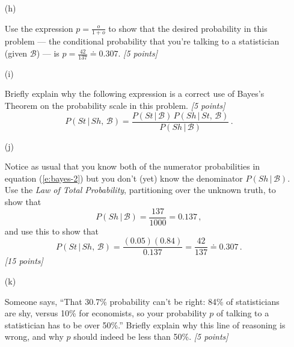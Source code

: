 \documentclass[12pt]{article}
\newcommand{\given}{\, | \,}
\begin{document}
\begin{itemize}
\item[(h)]

Use the expression $p = \frac{ o }{ 1 + o }$ to show that the desired probability in this problem --- the conditional probability that you're talking to a statistician (given $\mathcal{ B }$) --- is $p = \frac{ 42 }{ 137 } \doteq 0.307$. \textit{[5 points]}

\vspace*{0.75in}

\item[(i)]

Briefly explain why the following expression is a correct use of Bayes's Theorem on the probability scale in this problem. \textit{[5 points]}
\begin{equation} \label{e:bayes-1}
P ( St \given Sh, \, \mathcal{ B } ) = \frac{ P ( St \given \mathcal{ B } ) \, P ( Sh \given St, \, \mathcal{ B } ) }{ P ( Sh \given \mathcal{ B } ) } \, .
\end{equation}

\vspace*{0.5in}

\item[(j)]

Notice as usual that you know both of the numerator probabilities in equation (\ref{e:bayes-2}) but you don't (yet) know the denominator $P ( Sh \given \mathcal{ B } )$. Use the \textit{Law of Total Probability}, partitioning over the unknown truth, to show that
\begin{equation} \label{e:bayes-2}
P ( Sh \given \mathcal{ B } ) = \frac{ 137 }{ 1000 } = 0.137 \, ,
\end{equation}
and use this to show that
\begin{equation} \label{e:bayes-3}
P ( St \given Sh, \, \mathcal{ B } ) = \frac{ ( 0.05 ) ( 0.84 ) }{ 0.137 } = \frac{ 42 }{ 137 } \doteq 0.307 \, .
\end{equation}
\textit{[15 points]}

\vspace*{1.0in}

\item[(k)]

Someone says, ``That 30.7\% probability can't be right: 84\% of statisticians are shy, versus 10\% for economists, so your probability $p$ of talking to a statistician has to be over 50\%.'' Briefly explain why this line of reasoning is wrong, and why $p$ should indeed be less than 50\%. \textit{[5 points]}

\end{itemize}
\end{document}
